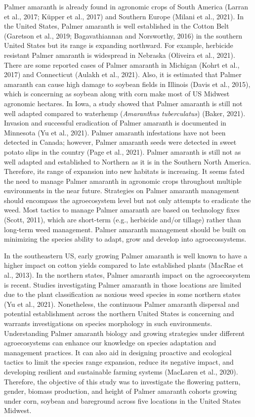 \documentclass[utf8]{frontiersSCNS}
\begin{document}
Palmer amaranth is already found in agronomic crops of South America
(Larran et al., 2017; Küpper et al., 2017) and Southern Europe (Milani
et al., 2021). In the United States, Palmer amaranth is well established
in the Cotton Belt (Garetson et al., 2019; Bagavathiannan and
Norsworthy, 2016) in the southern United States but its range is
expanding northward. For example, herbicide resistant Palmer amaranth is
widespread in Nebraska (Oliveira et al., 2021). There are some reported
cases of Palmer amaranth in Michigan (Kohrt et al., 2017) and
Connecticut (Aulakh et al., 2021). Also, it is estimated that Palmer
amaranth can cause high damage to soybean fields in Illinois (Davis et
al., 2015), which is concerning as soybean along with corn make most of
US Midwest agronomic hectares. In Iowa, a study showed that Palmer
amaranth is still not well adapted compared to waterhemp
(\emph{Amaranthus tuberculatus}) (Baker, 2021). Invasion and successful
eradication of Palmer amaranth is documented in Minnesota (Yu et al.,
2021). Palmer amaranth infestations have not been detected in Canada;
however, Palmer amaranth seeds were detected in sweet potato slips in
the country (Page et al., 2021). Palmer amaranth is still not as well
adapted and established to Northern as it is in the Southern North
America. Therefore, its range of expansion into new habitats is
increasing. It seems fated the need to manage Palmer amaranth in
agronomic crops throughout multiple environments in the near future.
Strategies on Palmer amaranth management should encompass the
agroecosystem level but not only attempts to eradicate the weed. Most
tactics to manage Palmer amaranth are based on technology fixes (Scott,
2011), which are short-term (e.g., herbicide and/or tillage) rather than
long-term weed management. Palmer amaranth management should be built on
minimizing the species ability to adapt, grow and develop into
agroecossystems.

In the southeastern US, early growing Palmer amaranth is well known to
have a higher impact on cotton yields compared to late established
plants (MacRae et al., 2013). In the northern states, Palmer amaranth
impact on the agroecosystem is recent. Studies investigating Palmer
amaranth in those locations are limited due to the plant classification
as noxious weed species in some northern states (Yu et al., 2021).
Nonetheless, the continuous Palmer amaranth dispersal and potential
establishment across the northern United States is concerning and
warrants investigations on species morphology in such environments.
Understanding Palmer amaranth biology and growing strategies under
different agroecosystems can enhance our knowledge on species adaptation
and management practices. It can also aid in designing proactive and
ecological tactics to limit the species range expansion, reduce its
negative impact, and developing resilient and sustainable farming
systems (MacLaren et al., 2020). Therefore, the objective of this study
was to investigate the flowering pattern, gender, biomass production,
and height of Palmer amaranth cohorts growing under corn, soybean and
bareground across five locations in the United States Midwest.
\end{document}
